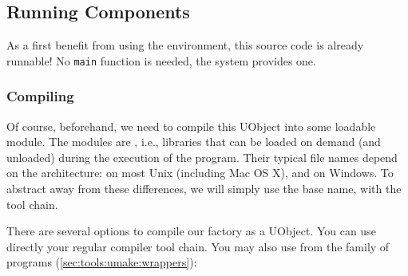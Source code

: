\subsection{Running Components}
\label{sec:uob:quick:run}
%


As a first benefit from using the \urbi environment, this source code
is already runnable!  No \lstinline|main| function is needed, the
\urbi system provides one.

\subsubsection{Compiling}
Of course, beforehand, we need to compile this UObject into some
loadable module.  The \urbi modules are , i.e.,
libraries that can be loaded on demand (and unloaded) during the
execution of the program.  Their typical file names depend on the
architecture:  on most Unix (including Mac OS X),
and  on Windows.
To abstract away from these differences, we will simply use the base
name,  with the \urbi tool chain.

There are several options to compile our factory as a UObject.  You
can use directly your regular compiler tool chain.  You may also use
 from the  family of programs
(\autoref{sec:tools:umake:wrappers}):


